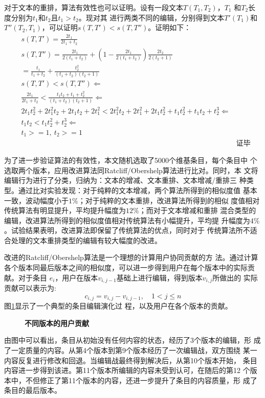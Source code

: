 对于文本的重排，算法有效性也可以证明。设有一段文本$T(T_1,T_2)$，$T_1$
和$T_2$长度分别为$t_1$和$t_2$且$t_1>t_2$。现对其
进行两类不同的编辑，分别得到文本$T'(T_1)$和$T''(T_2,T_1)$，可以证明$s(T,T')<s(T,T'')$。证明如下：
\begin{eqnarray*}
  \label{eq:3}
&s(T,T')=\frac{2t_1}{2t_1+t_2}& \\
&s(T,T'')=\frac{2t_1}{2(t_1+t_2)}+(1-\frac{2t_1}{2(t_1+t_2)})\frac{2t_2}{2(t_2+1)}&\\
         &=\frac{t_1}{t_1+t_2}+\frac{t_2^2}{(t_1+t_2)(t_2+1)}& \\
&s(T,T')<s(T,T'') \Leftarrow&   \\
&\frac{2t_1}{2t_1+t_2}<\frac{t_1t_2+t_1+t_2^2}{(t_1+t_2)(t_2+1)} \Leftarrow& \\
&2t_1t_2^2+2t_1^2t_2+2t_1t_2+2t_1^2<2t_1^2t_2+2t_1^2+2t_1t_2^2+t_1t_2^2+t_1t_2+t_2^3
\Leftarrow & \\
&t_1t_2<t_1t_2^2+t_2^3  \Leftarrow& \\
& t_1>=1, \ t_2>=1& \\
&&\text{证毕}
\end{eqnarray*}

为了进一步验证算法的有效性，本文随机选取了5000个维基条目，每个条目中
个选取两个版本，应用改进算法同Ratcliff/Obershelp算法进行比对。同时，本
文将编辑行为进行了分类，归纳为：文本的增减、文本重排、文本增减/重排三
种类型。通过比对实验发现：对于纯粹的文本增减，两个算法所得到的相似度值
基本一致，波动幅度小于$1\%$；对于纯粹的文本重排，改进算法所得到的相似
度值相对传统算法有明显提升，平均提升幅度为$12\%$；而对于文本增减和重排
混合类型的编辑，改进算法所得到的相似度值相对传统算法有小幅提升，平均提
升幅度为$4\%$。试验结果表明，改进算法即保留了传统算法的优点，同时对于
传统算法所不适合处理的文本重排类型的编辑有较大幅度的改进。

改进的Ratcliff/Obershelp算法是一个理想的计算用户协同贡献的方
法。通过计算
各个版本同最后版本之间的相似度，可以进一步得到用户在每个版本中的实际贡献。对于条目
$e_i$，用户在版本$v_{i,j-1}$基础上进行编辑，得到版本$v_{i,j}$所做出的
实际贡献可以表示为:
\[
c_{i,j}=v_{i,j}-v_{i,j-1}, \quad 1<j \leq n
\]
图\ref{fig:contribution}显示了一个典型的条目编辑演化过
程，以及用户在各个版本的贡献。
\begin{figure}[htp]
  \centering
 
  \caption{\small{\bf{不同版本的用户贡献}}}
  \label{fig:contribution}
\end{figure}

由图中可以看出，条目从初始没有任何内容的状态，经历了3个版本的编辑，形
成了一定质量的内容。从第4个版本到第9个版本经历了一次编辑战，双方围绕
某一内容反复进行修改和回退。当编辑战最终得到解决后，从第10个版本开始，
条目内容进一步得到该进。第11个版本所编辑的内容未受到认可，在随后的第12
个版本中，不但修正了第11个版本的内容，还进一步提升了条目的内容质量，形
成了条目的最后版本。


